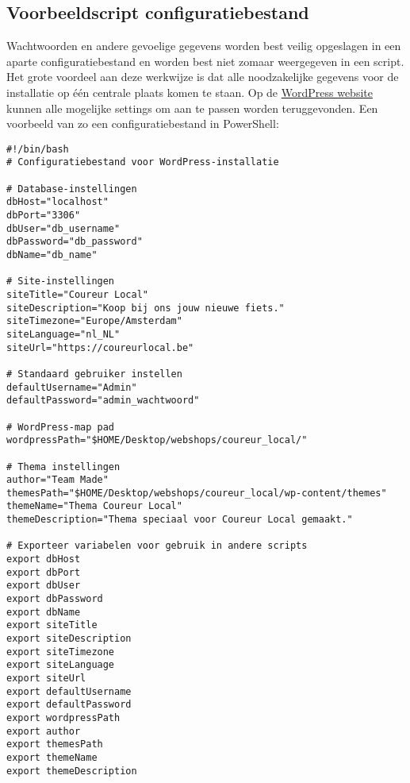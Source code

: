 \subsection{Voorbeeldscript configuratiebestand}
Wachtwoorden en andere gevoelige gegevens worden best veilig opgeslagen in een aparte configuratiebestand en worden best niet zomaar weergegeven in een script. Het grote voordeel aan deze werkwijze is dat alle noodzakelijke gegevens voor de installatie op één centrale plaats komen te staan. Op de \href{https://wordpress.org/documentation/article/settings-general-screen/}{WordPress website} kunnen alle mogelijke settings om aan te passen worden teruggevonden. Een voorbeeld van zo een configuratiebestand in PowerShell:
\begin{verbatim}
#!/bin/bash
# Configuratiebestand voor WordPress-installatie

# Database-instellingen
dbHost="localhost"
dbPort="3306"
dbUser="db_username"
dbPassword="db_password"
dbName="db_name"

# Site-instellingen
siteTitle="Coureur Local"
siteDescription="Koop bij ons jouw nieuwe fiets."
siteTimezone="Europe/Amsterdam"
siteLanguage="nl_NL"
siteUrl="https://coureurlocal.be"

# Standaard gebruiker instellen
defaultUsername="Admin"
defaultPassword="admin_wachtwoord"

# WordPress-map pad
wordpressPath="$HOME/Desktop/webshops/coureur_local/"

# Thema instellingen
author="Team Made"
themesPath="$HOME/Desktop/webshops/coureur_local/wp-content/themes"
themeName="Thema Coureur Local"
themeDescription="Thema speciaal voor Coureur Local gemaakt."

# Exporteer variabelen voor gebruik in andere scripts
export dbHost
export dbPort
export dbUser
export dbPassword
export dbName
export siteTitle
export siteDescription
export siteTimezone
export siteLanguage
export siteUrl
export defaultUsername
export defaultPassword
export wordpressPath
export author
export themesPath
export themeName
export themeDescription
\end{verbatim}


